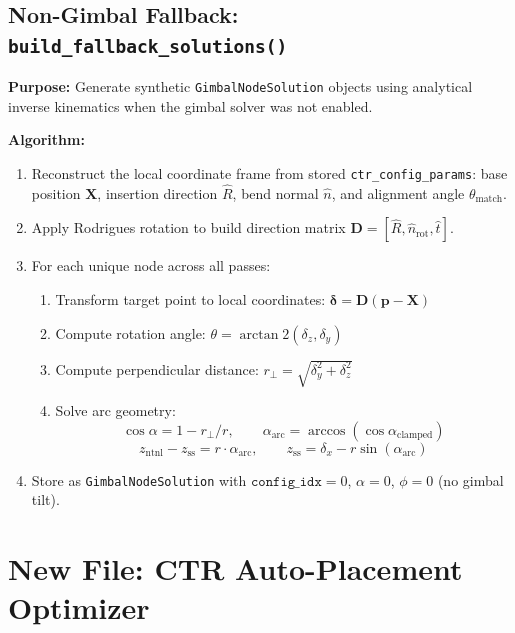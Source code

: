 \documentclass[11pt,a4paper]{article}
\newcommand{\funcname}[1]{\texttt{\textcolor{codepurple}{#1}}}
\begin{document}
\subsection{Non-Gimbal Fallback: \funcname{build\_fallback\_solutions()}}

\textbf{Purpose:} Generate synthetic \texttt{GimbalNodeSolution} objects using analytical inverse kinematics when the gimbal solver was not enabled.

\textbf{Algorithm:}
\begin{enumerate}[nosep]
    \item Reconstruct the local coordinate frame from stored \texttt{ctr\_config\_params}: base position $\mathbf{X}$, insertion direction $\hat{R}$, bend normal $\hat{n}$, and alignment angle $\theta_\text{match}$.
    \item Apply Rodrigues rotation to build direction matrix $\mathbf{D} = [\hat{R}, \hat{n}_\text{rot}, \hat{t}]$.
    \item For each unique node across all passes:
    \begin{enumerate}[nosep,label=(\alph*)]
        \item Transform target point to local coordinates: $\boldsymbol{\delta} = \mathbf{D} (\mathbf{p} - \mathbf{X})$
        \item Compute rotation angle: $\theta = \arctan2(\delta_z, \delta_y)$
        \item Compute perpendicular distance: $r_\perp = \sqrt{\delta_y^2 + \delta_z^2}$
        \item Solve arc geometry:
        \[
        \cos\alpha = 1 - r_\perp / r, \qquad \alpha_\text{arc} = \arccos(\cos\alpha_\text{clamped})
        \]
        \[
        z_\text{ntnl} - z_\text{ss} = r \cdot \alpha_\text{arc}, \qquad z_\text{ss} = \delta_x - r \sin(\alpha_\text{arc})
        \]
    \end{enumerate}
    \item Store as \texttt{GimbalNodeSolution} with $\texttt{config\_idx}=0$, $\alpha=0$, $\phi=0$ (no gimbal tilt).
\end{enumerate}

\section{New File: CTR Auto-Placement Optimizer}
\label{sec:ctr_placement}
\end{document}
